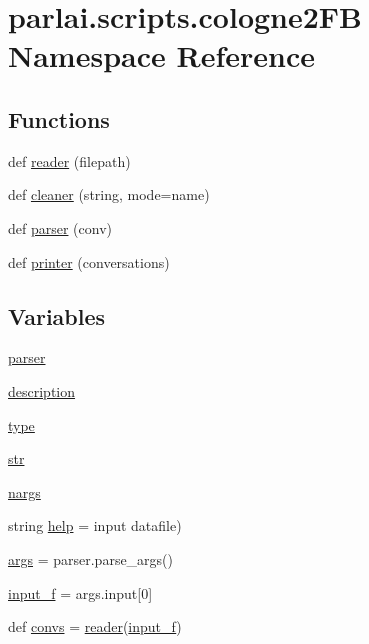 \hypertarget{namespaceparlai_1_1scripts_1_1cologne2FB}{}\section{parlai.\+scripts.\+cologne2\+FB Namespace Reference}
\label{namespaceparlai_1_1scripts_1_1cologne2FB}
\subsection*{Functions}
\begin{DoxyCompactItemize}
\item 
def \hyperlink{namespaceparlai_1_1scripts_1_1cologne2FB_ac3f89c025290a81b76a7573f7c1e5d7a}{reader} (filepath)
\item 
def \hyperlink{namespaceparlai_1_1scripts_1_1cologne2FB_a8a2fb9f6897ef06ab2421d6682dca667}{cleaner} (string, mode=\textquotesingle{}name\textquotesingle{})
\item 
def \hyperlink{namespaceparlai_1_1scripts_1_1cologne2FB_a3d8c5febb71cafe49cc8a5a71c4ba2c5}{parser} (conv)
\item 
def \hyperlink{namespaceparlai_1_1scripts_1_1cologne2FB_a82c4edd06c5b6498faa16f8481278be4}{printer} (conversations)
\end{DoxyCompactItemize}
\subsection*{Variables}
\begin{DoxyCompactItemize}
\item 
\hyperlink{namespaceparlai_1_1scripts_1_1cologne2FB_ae4ca5aa12315e73670c9f97f56d4f355}{parser}
\item 
\hyperlink{namespaceparlai_1_1scripts_1_1cologne2FB_a9df96294db981e8d5f78b55326277cad}{description}
\item 
\hyperlink{namespaceparlai_1_1scripts_1_1cologne2FB_a63548cb270a13793932d035e97e5c85d}{type}
\item 
\hyperlink{namespaceparlai_1_1scripts_1_1cologne2FB_aee25ee82cc84a4eb26e63f3c59013ca4}{str}
\item 
\hyperlink{namespaceparlai_1_1scripts_1_1cologne2FB_a84b7007d3ed49d5b3a17544e5f6fa78e}{nargs}
\item 
string \hyperlink{namespaceparlai_1_1scripts_1_1cologne2FB_ade34f9304b39eda1beb7c097d6395840}{help} = \textquotesingle{}input datafile\textquotesingle{})
\item 
\hyperlink{namespaceparlai_1_1scripts_1_1cologne2FB_a5f672b8f854fe6a7d69411a32a620f70}{args} = parser.\+parse\+\_\+args()
\item 
\hyperlink{namespaceparlai_1_1scripts_1_1cologne2FB_a9fb0e1be0c8c3b931027b2dba74bfa4c}{input\+\_\+f} = args.\+input\mbox{[}0\mbox{]}
\item 
def \hyperlink{namespaceparlai_1_1scripts_1_1cologne2FB_a10488f760ce47c1eb227df595dd0831b}{convs} = \hyperlink{namespaceparlai_1_1scripts_1_1cologne2FB_ac3f89c025290a81b76a7573f7c1e5d7a}{reader}(\hyperlink{namespaceparlai_1_1scripts_1_1cologne2FB_a9fb0e1be0c8c3b931027b2dba74bfa4c}{input\+\_\+f})
\end{DoxyCompactItemize}


